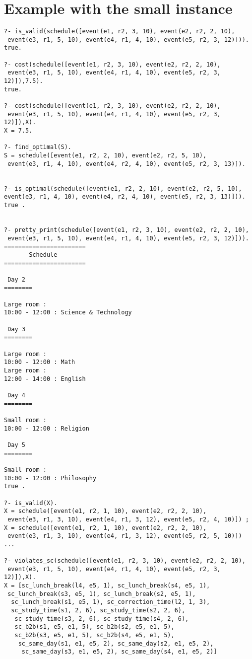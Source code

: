 \documentclass[a4paper]{article}
\begin{document}
\section{Example with the small instance}
\begin{lstlisting}[style=Linux]
?- is_valid(schedule([event(e1, r2, 3, 10), event(e2, r2, 2, 10),
 event(e3, r1, 5, 10), event(e4, r1, 4, 10), event(e5, r2, 3, 12)])).
true.

?- cost(schedule([event(e1, r2, 3, 10), event(e2, r2, 2, 10),
 event(e3, r1, 5, 10), event(e4, r1, 4, 10), event(e5, r2, 3, 12)]),7.5).
true.

?- cost(schedule([event(e1, r2, 3, 10), event(e2, r2, 2, 10),
 event(e3, r1, 5, 10), event(e4, r1, 4, 10), event(e5, r2, 3, 12)]),X).
X = 7.5.

?- find_optimal(S).
S = schedule([event(e1, r2, 2, 10), event(e2, r2, 5, 10),
 event(e3, r1, 4, 10), event(e4, r2, 4, 10), event(e5, r2, 3, 13)]).
 
 
?- is_optimal(schedule([event(e1, r2, 2, 10), event(e2, r2, 5, 10), event(e3, r1, 4, 10), event(e4, r2, 4, 10), event(e5, r2, 3, 13)])).
true .


?- pretty_print(schedule([event(e1, r2, 3, 10), event(e2, r2, 2, 10),
 event(e3, r1, 5, 10), event(e4, r1, 4, 10), event(e5, r2, 3, 12)])).
=======================
       Schedule
=======================

 Day 2 
========

Large room :
10:00 - 12:00 : Science & Technology

 Day 3 
========

Large room :
10:00 - 12:00 : Math
Large room :
12:00 - 14:00 : English

 Day 4 
========

Small room :
10:00 - 12:00 : Religion

 Day 5 
========

Small room :
10:00 - 12:00 : Philosophy
true .

?- is_valid(X).
X = schedule([event(e1, r2, 1, 10), event(e2, r2, 2, 10),
 event(e3, r1, 3, 10), event(e4, r1, 3, 12), event(e5, r2, 4, 10)]) ;
X = schedule([event(e1, r2, 1, 10), event(e2, r2, 2, 10),
 event(e3, r1, 3, 10), event(e4, r1, 3, 12), event(e5, r2, 5, 10)])
...

?- violates_sc(schedule([event(e1, r2, 3, 10), event(e2, r2, 2, 10),
 event(e3, r1, 5, 10), event(e4, r1, 4, 10), event(e5, r2, 3, 12)]),X).
X = [sc_lunch_break(l4, e5, 1), sc_lunch_break(s4, e5, 1),
 sc_lunch_break(s3, e5, 1), sc_lunch_break(s2, e5, 1),
  sc_lunch_break(s1, e5, 1), sc_correction_time(l2, 1, 3),
  sc_study_time(s1, 2, 6), sc_study_time(s2, 2, 6),
   sc_study_time(s3, 2, 6), sc_study_time(s4, 2, 6),
   sc_b2b(s1, e5, e1, 5), sc_b2b(s2, e5, e1, 5),
   sc_b2b(s3, e5, e1, 5), sc_b2b(s4, e5, e1, 5),
    sc_same_day(s1, e1, e5, 2), sc_same_day(s2, e1, e5, 2),
     sc_same_day(s3, e1, e5, 2), sc_same_day(s4, e1, e5, 2)] 


\end{lstlisting}
\end{document}
